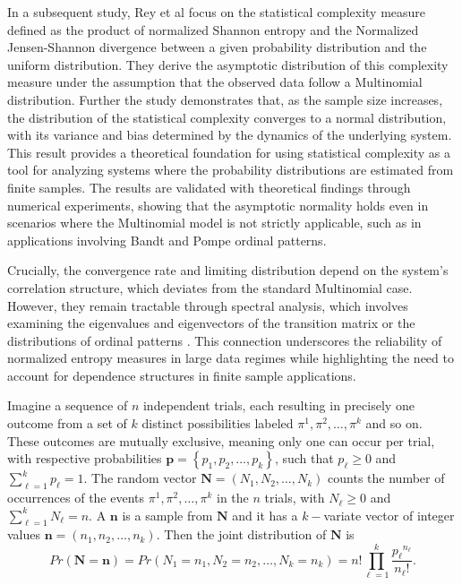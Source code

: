 In a subsequent study, Rey et al \cite{Rey2025} focus on the statistical complexity measure defined as the product of normalized Shannon entropy and the Normalized Jensen-Shannon divergence between a given probability distribution and the uniform distribution. 
They derive the asymptotic distribution of this complexity measure under the assumption that the observed data follow a Multinomial distribution. Further the study demonstrates that, as the sample size increases, the distribution of the statistical complexity converges to a normal distribution, with its variance and bias determined by the dynamics of the underlying system. This result provides a theoretical foundation for using statistical complexity as a tool for analyzing systems where the probability distributions are estimated from finite samples. The results are validated with theoretical findings through numerical experiments, showing that the asymptotic normality holds even in scenarios where the Multinomial model is not strictly applicable, such as in applications involving Bandt and Pompe ordinal patterns. 

Crucially, the convergence rate and limiting distribution depend on the system’s correlation structure, which deviates from the standard Multinomial case. However, they remain tractable through spectral analysis, which involves examining the eigenvalues and eigenvectors of the transition matrix or the distributions of ordinal patterns \cite{Chagas2022,PhysRevE.103.022215}. 
This connection underscores the reliability of normalized entropy measures in large data regimes while highlighting the need to account for dependence structures in finite sample applications.


Imagine a sequence of $n$ independent trials, each resulting in precisely one outcome from a set of $k$ distinct possibilities labeled $\pi^1,\pi^2, \dots, \pi^k$ and so on. These outcomes are mutually exclusive, meaning only one can occur per trial, with respective probabilities $\mathbf{p}={\left\{p_1,p_2,\dots,p_k\right\}}$, such that $p_\ell \geq 0$ and $\sum^{k}_{\ell=1} {p_\ell =1}.$ The random vector $\mathbf{N}=(N_1,N_2,\dots, N_k)$ counts the number of occurrences of the events $\pi^1,\pi^2, \dots, \pi^k$ in the $n$ trials, with $N_\ell \geq0$ and $\sum^{k}_{\ell=1} {N_\ell =n}.$ A $\mathbf{n}$ is a sample from $\mathbf{N}$ and it has a $k-$variate vector of integer values $\mathbf{n}=(n_1,n_2,\dots,n_k).$ Then the joint distribution of $\mathbf{N}$ is 
\begin{equation}
	Pr(\mathbf{N=n})=Pr(N_1=n_1,N_2=n_2, \dots,N_k=n_k)=n!\prod_{\ell=1}^{k}\frac{{p_\ell}^{n_\ell}}{n_\ell !}.
\end{equation}   

